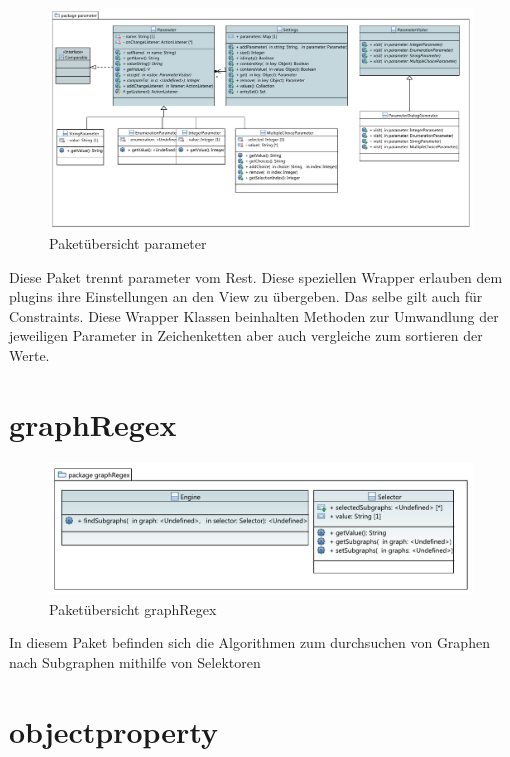 \begin{figure}[hb]
  \centering
  \includegraphics[width=380pt]{resourcen/parameter.pdf}
  \caption{Paketübersicht parameter}
  \label{fig:packge_parameter}
\end{figure}

Diese Paket trennt parameter vom Rest. Diese speziellen Wrapper erlauben dem plugins ihre Einstellungen an den View zu übergeben. Das selbe gilt auch für Constraints. Diese Wrapper Klassen beinhalten Methoden zur Umwandlung der jeweiligen Parameter in Zeichenketten aber auch vergleiche zum sortieren der Werte.

\newpage

\section{graphRegex}

\begin{figure}[hb]
  \centering
  \includegraphics[width=380pt]{resourcen/graphRegex.pdf}
  \caption{Paketübersicht graphRegex}
  \label{fig:packge_graphRegex}
\end{figure}

In diesem Paket befinden sich die Algorithmen zum durchsuchen von Graphen nach Subgraphen mithilfe von Selektoren

\newpage

\section{objectproperty}

